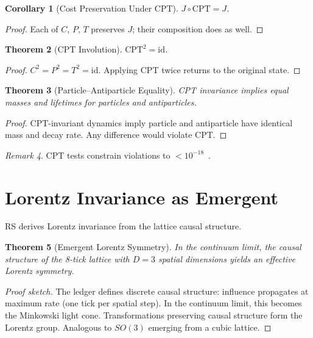 \documentclass[12pt,a4paper]{article}
\newtheorem{theorem}{Theorem}[section]
\newtheorem{corollary}[theorem]{Corollary}
\theoremstyle{definition}
\theoremstyle{remark}
\newtheorem{remark}[theorem]{Remark}
\begin{document}
\begin{corollary}[Cost Preservation Under CPT]
\label{cor:cpt-preserves}
$J \circ \mathrm{CPT} = J$.
\end{corollary}

\begin{proof}
Each of $C$, $P$, $T$ preserves $J$; their composition does as well.
\end{proof}

\begin{theorem}[CPT Involution]
\label{thm:cpt-involution}
$\mathrm{CPT}^2 = \mathrm{id}$.
\end{theorem}

\begin{proof}
$C^2 = P^2 = T^2 = \mathrm{id}$.  Applying CPT twice returns to the original
state.
\end{proof}

\begin{theorem}[Particle--Antiparticle Equality]
\label{thm:particle-antiparticle}
CPT invariance implies equal masses and lifetimes for particles and
antiparticles.
\end{theorem}

\begin{proof}
CPT-invariant dynamics imply particle and antiparticle have identical mass
and decay rate.  Any difference would violate CPT.
\end{proof}

\begin{remark}
CPT tests constrain violations to $< 10^{-18}$~\cite{CPTtests}.
\end{remark}

\section{Lorentz Invariance as Emergent}
\label{sec:lorentz}

RS derives Lorentz invariance from the lattice causal structure.

\begin{theorem}[Emergent Lorentz Symmetry]
\label{thm:lorentz}
In the continuum limit, the causal structure of the 8-tick lattice with $D=3$
spatial dimensions yields an effective Lorentz symmetry.
\end{theorem}

\begin{proof}[Proof sketch]
The ledger defines discrete causal structure: influence propagates at maximum
rate (one tick per spatial step).  In the continuum limit, this becomes the
Minkowski light cone.  Transformations preserving causal structure form the
Lorentz group.  Analogous to $SO(3)$ emerging from a cubic lattice.
\end{proof}
\end{document}
